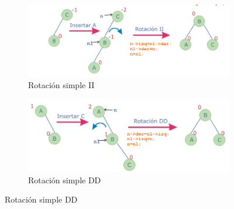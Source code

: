 \documentclass{article}
\begin{document}
\begin{figure}[h]
    \centering
    \begin{subfigure}{0.45\textwidth}
        \centering
        \includegraphics[width=\linewidth]{img-t4/img_418_05.png}
        \caption{Rotación simple II}
        \label{fig:imagen1}
    \end{subfigure}
    \hfill
    \begin{subfigure}{0.45\textwidth}
        \centering
        \includegraphics[width=\linewidth]{img-t4/img_079_14.png}
        \caption{Rotación simple DD}
        \label{fig:imagen2}
    \end{subfigure}
    \label{fig:imagenes}
\end{figure}
\end{document}
